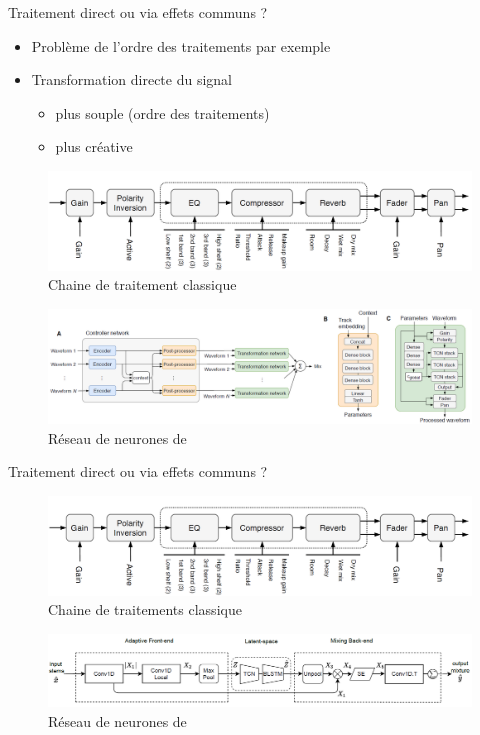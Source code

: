 \documentclass[9pt, aspectratio=169]{beamer}
\begin{document}
\begin{frame}{Traitement direct ou via effets communs ?} %

\begin{itemize}
	\item Problème de l'ordre des traitements par exemple
	\item Transformation directe du signal
	\begin{itemize}
		\item plus souple (ordre des traitements)
		\item plus créative
	\end{itemize}
\end{itemize}


\begin{figure}
\includegraphics[width=.6\textwidth]{fig/channel_strip.png}
\caption{Chaine de traitement classique}
\end{figure}

\begin{figure}
\includegraphics[width=.7\textwidth]{fig/steinmetz2021_diffmix.png}
\caption{Réseau de neurones de \cite{steinmetz_automatic_2020}}
\end{figure}
\end{frame}

\begin{frame}{Traitement direct ou via effets communs ?} %
\begin{figure}
\includegraphics[width=.6\textwidth]{fig/channel_strip.png}
\caption{Chaine de traitements classique}
\end{figure}

\begin{figure}
\includegraphics[width=\textwidth]{fig/martinez_ramirez2022_architecture.png}
\caption{Réseau de neurones de \cite{martinez-ramirez_automatic_2022}}
\end{figure}
\end{frame}
\end{document}
